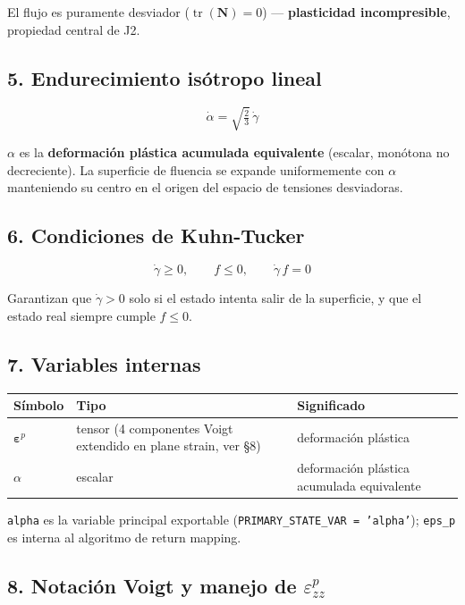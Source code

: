 \documentclass[11pt,letterpaper,oneside]{report}
\begin{document}
El flujo es puramente desviador ($\operatorname{tr}(\mathbf N) = 0$) --- \textbf{plasticidad incompresible}, propiedad central de J2.

\subsection{5. Endurecimiento isótropo lineal}

\[
\dot\alpha = \sqrt{\tfrac{2}{3}}\,\dot\gamma
\]

$\alpha$ es la \textbf{deformación plástica acumulada equivalente} (escalar, monótona no decreciente). La superficie de fluencia se expande uniformemente con $\alpha$ manteniendo su centro en el origen del espacio de tensiones desviadoras.

\subsection{6. Condiciones de Kuhn-Tucker}

\[
\dot\gamma \geq 0, \qquad f \leq 0, \qquad \dot\gamma\,f = 0
\]

Garantizan que $\dot\gamma > 0$ solo si el estado intenta salir de la superficie, y que el estado real siempre cumple $f \leq 0$.

\subsection{7. Variables internas}

\begin{center}
\begin{tabularx}{\textwidth}{YYY}
\hline
\textbf{Símbolo} & \textbf{Tipo} & \textbf{Significado} \\
\hline
$\boldsymbol\varepsilon^p$ & tensor (4 componentes Voigt extendido en plane strain, ver §8) & deformación plástica \\
$\alpha$ & escalar & deformación plástica acumulada equivalente \\
\hline
\end{tabularx}
\end{center}
\texttt{alpha} es la variable principal exportable (\texttt{PRIMARY\_STATE\_VAR = 'alpha'}); \texttt{eps\_p} es interna al algoritmo de return mapping.

\subsection{8. Notación Voigt y manejo de $\varepsilon^p_{zz}$}
\end{document}

